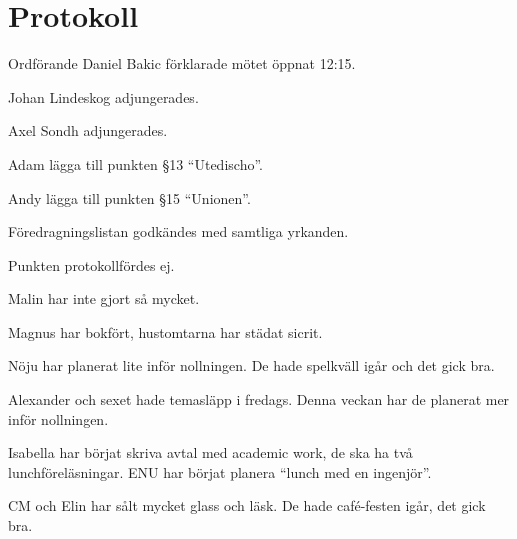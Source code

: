\documentclass[10pt]{article}
\def\mo{Daniel Bakic}
\begin{document}
\section*{Protokoll}
\begin{paragrafer}
	Ordförande {\mo} förklarade mötet öppnat 12:15.
	
	{\valavmo}
	
	{\valavms}
	
	{\valavj}
	
	{\tosg}
	
	Johan Lindeskog adjungerades.

	Axel Sondh adjungerades. 
	
	Adam \ypa lägga till punkten \S13 ``Utedischo''.
	
	Andy \ypa lägga till punkten \S15 ``Unionen''.
	
	Föredragningslistan godkändes med samtliga yrkanden.
	
	\ingaprot
	
	\begin{fyllnadsval} %
	\end{fyllnadsval}
	
	\begin{paragrafer}
		Punkten protokollfördes ej.
		
		Malin har inte gjort så mycket.
		
		Magnus har bokfört, hustomtarna har städat sicrit.

		Nöju har planerat lite inför nollningen. De hade spelkväll igår och det gick bra. 

		Alexander och sexet hade temasläpp i fredags. Denna veckan har de planerat mer inför nollningen.

		Isabella har börjat skriva avtal med academic work, de ska ha två lunchföreläsningar. ENU har börjat planera ``lunch med en ingenjör''.

		CM och Elin har sålt mycket glass och läsk. De hade café-festen igår, det gick bra.


\end{paragrafer}
\end{paragrafer}
\end{document}
